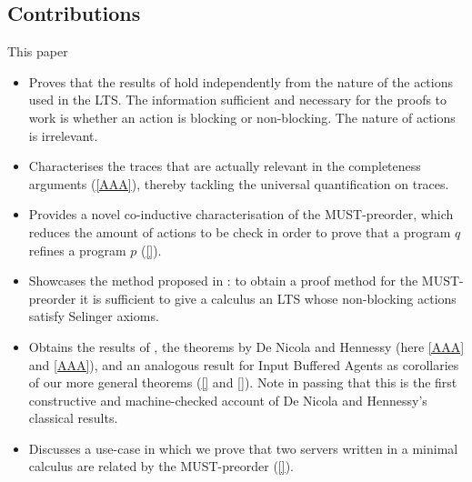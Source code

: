 \subsection*{Contributions} 
This paper
\begin{itemize}
\item Proves that the results of \cite{} hold independently
  from the nature of the actions used in the LTS.
  The information sufficient and necessary for the proofs
  to work is whether an action is blocking or non-blocking.
  The nature of actions is irrelevant.
  
\item Characterises the traces that are actually relevant in the
  completeness arguments (\ref{AAA}),
  thereby tackling the universal
  quantification on traces.

\item Provides a novel co-inductive characterisation of
  the MUST-preorder, which reduces the amount of actions
  to be check in order to prove that a program $q$ refines
  a program $p$ (\ref{}).

\item Showcases the method proposed in \cite{}:
  to obtain a proof method for the MUST-preorder it is sufficient to
  give a calculus an LTS whose non-blocking actions satisfy Selinger
  axioms.
  

\item
  Obtains the results of \cite{}, the theorems by De Nicola and
  Hennessy (here \ref{AAA} and \ref{AAA}), and an analogous result for
  Input Buffered Agents as corollaries of our more general theorems
  (\ref{} and \ref{}).
  Note in passing that this is the first constructive and machine-checked
  account of De Nicola and Hennessy's classical results.
  
\item Discusses a use-case in which we prove that two servers
  written in a minimal calculus are related by the MUST-preorder (\ref{}).
\end{itemize}
